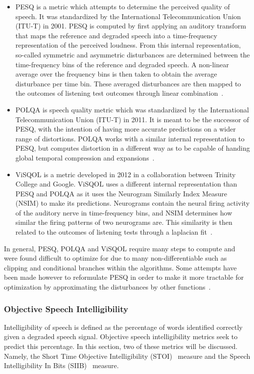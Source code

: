 \begin{itemize}
    \item 
PESQ is a metric which attempts to determine the perceived quality of speech.
It was standardized by the International Telecommunication Union (ITU-T) in 2001.
PESQ is computed by first applying an auditory transform that maps the reference and degraded speech into a 
time-frequency representation of the perceived loudness.
From this internal representation, so-called symmetric and asymmetric disturbances are determined 
between the time-frequency bins of the reference and degraded speech. 
A non-linear average over the frequency bins is then taken to obtain the average disturbance per time bin.
These averaged disturbances are then mapped to the outcomes of listening test outcomes through linear 
combination~\cite{rix2001perceptual}.
    \item
POLQA is speech quality metric which was standardized by the International Telecommunication Union (ITU-T) in 2011. 
It is meant to be the successor of PESQ, with the intention of having more accurate predictions on a 
wider range of distortions.
POLQA works with a similar internal representation to PESQ, but computes distortion in a different way 
as to be capable of handing global temporal compression and expansions~\cite{beerends2013perceptual}.
    \item
ViSQOL is a metric developed in 2012 in a collaboration between Trinity College and Google.
ViSQOL uses a different internal representation than PESQ and POLQA as it uses the Neurogram Similarly Index Measure (NSIM)
to make its predictions.
Neurograms contain the neural firing activity of the auditory nerve in time-frequency bins, and NSIM determines how similar
the firing patterns of two neurograms are.
This similarity is then related to the outcomes of listening tests through a laplacian fit~\cite{hines2012visqol}.
\end{itemize}
In general, PESQ, POLQA and ViSQOL require many steps to compute and were found difficult to optimize for due to many
non-differentiable such as clipping and conditional branches within the algorithms.
Some attempts have been made however to reformulate PESQ in order to make it more tractable for optimization 
by approximating the disturbances by other functions~\cite{kim2019end}.

\subsubsection{Objective Speech Intelligibility}
Intelligibility of speech is defined as the percentage of words identified correctly given a degraded speech signal.
Objective speech intelligibility metrics seek to predict this percentage.
In this section, two of these metrics will be discussed.
Namely, the Short Time Objective Intelligibility (STOI)~\cite{taal2011algorithm} measure and the 
Speech Intelligibility In Bits (SIIB)~\cite{van2017instrumental} measure.

